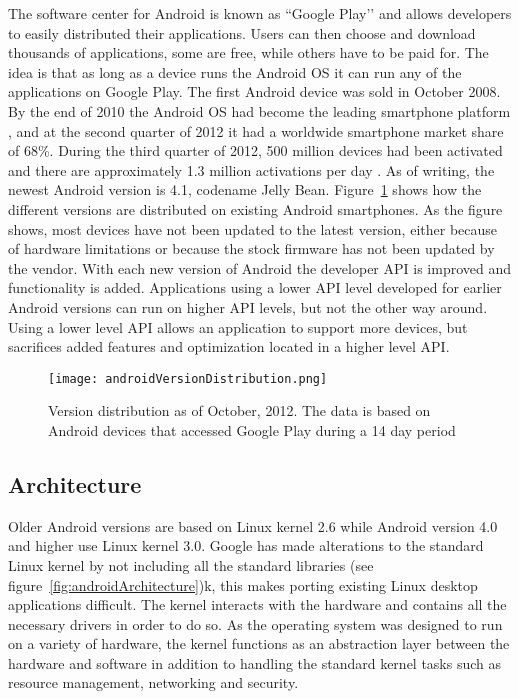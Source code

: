 The software center for Android is known as ``Google Play’’ and allows developers to easily distributed their applications. Users can then choose and download thousands of applications, some are free, while others have to be paid for. The idea is that as long as a device runs the Android OS it can run any of the applications on Google Play. The first Android device was sold in October 2008. By the end of 2010 the Android OS had become the leading smartphone platform \cite{androidLeadingPlatform}, and at the second quarter of 2012 it had a worldwide smartphone market share of 68\%\cite{androidMarketShare}. During the third quarter of 2012, 500 million devices had been activated and there are approximately 1.3 million activations per day \cite{androidDevices}. As of writing, the newest Android version is 4.1, codename Jelly Bean. Figure~\ref{fig:verDist} shows how the different versions are distributed on existing Android smartphones. As the figure shows, most devices have not been updated to the latest version, either because of hardware limitations or because the stock firmware has not been updated by the vendor. With each new version of Android the developer API is improved and functionality is added. Applications using a lower API level developed for earlier Android versions can run on higher API levels, but not the other way around. Using a lower level API allows an application to support more devices, but sacrifices added features and optimization located in a higher level API.

\begin{figure}[h!]
  \centering
    \texttt{[image: androidVersionDistribution.png]}
    \caption{\footnotesize Version distribution as of October, 2012. The data is based on Android devices that accessed Google Play during a 14 day period \cite{androidVersions}}
  \label{fig:verDist}
\end{figure}

\subsection{Architecture}
Older Android versions are based on Linux kernel 2.6 while Android version 4.0 and higher use Linux kernel 3.0. Google has made alterations to the standard Linux kernel by not including all the standard libraries (see figure~\ref{fig:androidArchitecture})k, this makes porting existing Linux desktop applications difficult. The kernel interacts with the hardware and contains all the necessary drivers in order to do so. As the operating system was designed to run on a variety of hardware, the kernel functions as an abstraction layer between the hardware and software in addition to handling the standard kernel tasks such as resource management, networking and security.

